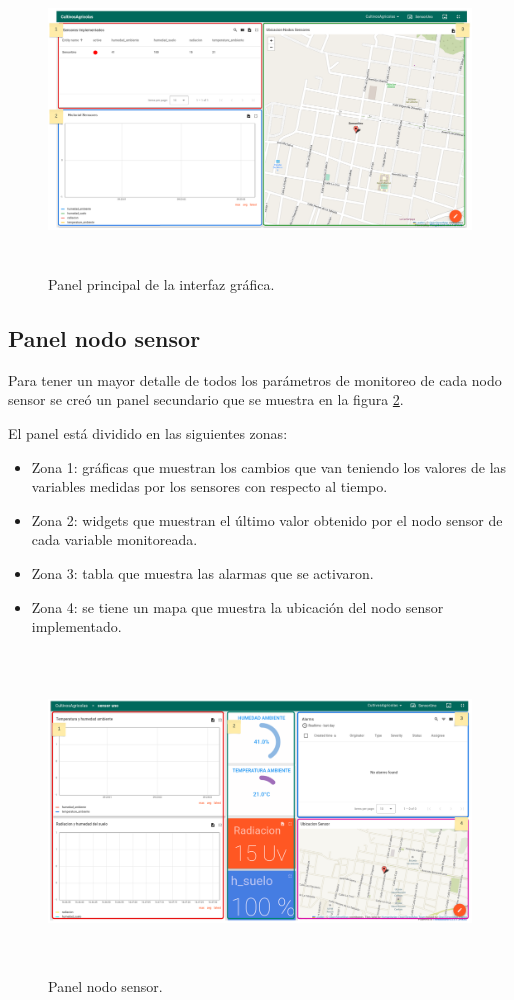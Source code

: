 \begin{figure}[h]
  \centering
	\includegraphics[width=\textwidth, height=8cm]{./Figures/panel_principal_editado.png}
  \caption{Panel principal de la interfaz gráfica.}
	\label{fig:Panel principal}
\end{figure}

\subsection{Panel nodo sensor} 

Para tener un mayor detalle de todos los parámetros de monitoreo de cada nodo sensor se creó un panel secundario que se muestra en la figura \ref{fig:Panel nodo sensor}.

El panel está dividido en las siguientes zonas:
\begin{itemize}
  \item Zona 1: gráficas que muestran los cambios que van teniendo los valores de las variables medidas por los sensores con respecto al tiempo.
  \item Zona 2: widgets que muestran el último valor obtenido por el nodo sensor de cada variable monitoreada.
  \item Zona 3: tabla que muestra las alarmas que se activaron. 
  \item Zona 4: se tiene un mapa que muestra la ubicación del nodo sensor implementado.
\end{itemize}

\begin{figure}[h!]
  \centering
	\includegraphics[width=\textwidth, height=8.5cm]{./Figures/panel_nodosensor_editado.png}
  \caption{Panel nodo sensor.}
	\label{fig:Panel nodo sensor}
\end{figure}